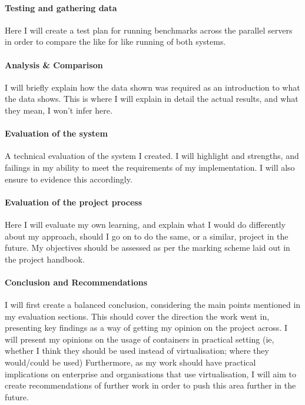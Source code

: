 \paragraph{Testing and gathering data} Here I will create a test plan for running benchmarks across the parallel servers in order to compare the like for like running of both systems.

\paragraph{Analysis \& Comparison} I will briefly explain how the data shown was required as an introduction to what the data shows. This is where I will explain in detail the actual results, and what they mean, I won't infer here.

\paragraph{Evaluation of the system} A technical evaluation of the system I created. I will highlight and strengths, and failings in my ability to meet the requirements of my implementation. I will also ensure to evidence this accordingly.

\paragraph{Evaluation of the project process} Here I will evaluate my own learning, and explain what I would do differently about my approach, should I go on to do the same, or a similar, project in the future. My objectives should be assessed as per the marking scheme laid out in the project handbook.

\paragraph{Conclusion and Recommendations} I will first create a balanced conclusion, considering the main points mentioned in my evaluation sections. This should cover the direction the work went in, presenting key findings as a way of getting my opinion on the project across. I will present my opinions on the usage of containers in practical setting (ie, whether I think they should be used instead of virtualisation; where they would/could be used) Furthermore, as my work should have practical implications on enterprise and organisations that use virtualisation, I will aim to create recommendations of further work in order to push this area further in the future.


